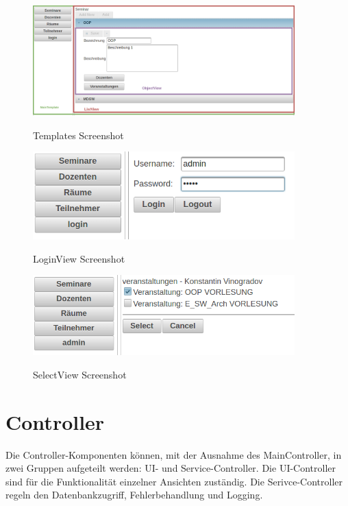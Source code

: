 \begin{figure}[htb!]
	\caption{Templates Screenshot}
	\includegraphics[width=0.9\textwidth]{content/pictures/Seminarverwaltung_ListAndObjectView}
	\label{pic:semVer_allViews}
\end{figure}

\begin{figure}[htb!]
	\caption{LoginView Screenshot}
	\includegraphics[width=0.9\textwidth]{content/pictures/Seminarverwaltung_LoginView}
	\label{pic:semVer_loginView}
\end{figure}

\begin{figure}[htb!]
	\caption{SelectView Screenshot}
	\includegraphics[width=0.9\textwidth]{content/pictures/Seminarverwaltung_SelectView}
	\label{pic:semVer_selectView}
\end{figure}

\newpage

\section{Controller}

Die Controller-Komponenten können, mit der Ausnahme des MainController, in zwei Gruppen aufgeteilt werden: UI- und Service-Controller.
Die UI-Controller sind für die Funktionalität einzelner Ansichten zuständig. Die Serivce-Controller regeln den Datenbankzugriff,
Fehlerbehandlung und Logging.

